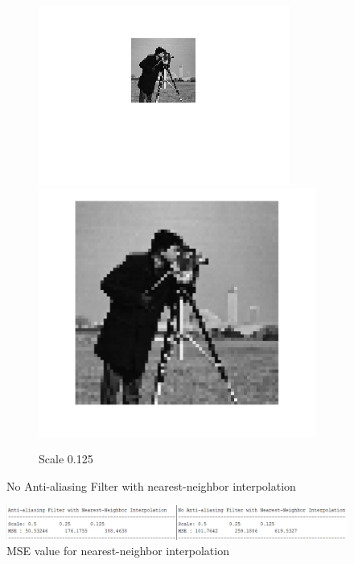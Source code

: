 \documentclass{article}
\begin{document}
\begin{figure}[h!]
\begin{subfigure}[t]{0.3\textwidth}
		\includegraphics[width=\linewidth]{./output_images/DOWN_no_anti-alias_nearest_scale_0_125000.png}
		\includegraphics[width=\linewidth]{./output_images/UP_no_anti-alias_nearest_scale_0_125000.png}
		\caption{Scale 0.125}
	\end{subfigure}
	\caption{No Anti-aliasing Filter with nearest-neighbor interpolation}
\end{figure}

\begin{figure}[h!]
	\centering
	\includegraphics[width=\linewidth]{./output_images/MSE_nearest_neighbor.png}
	\caption{MSE value for nearest-neighbor interpolation}
\end{figure}
	
\end{document}
